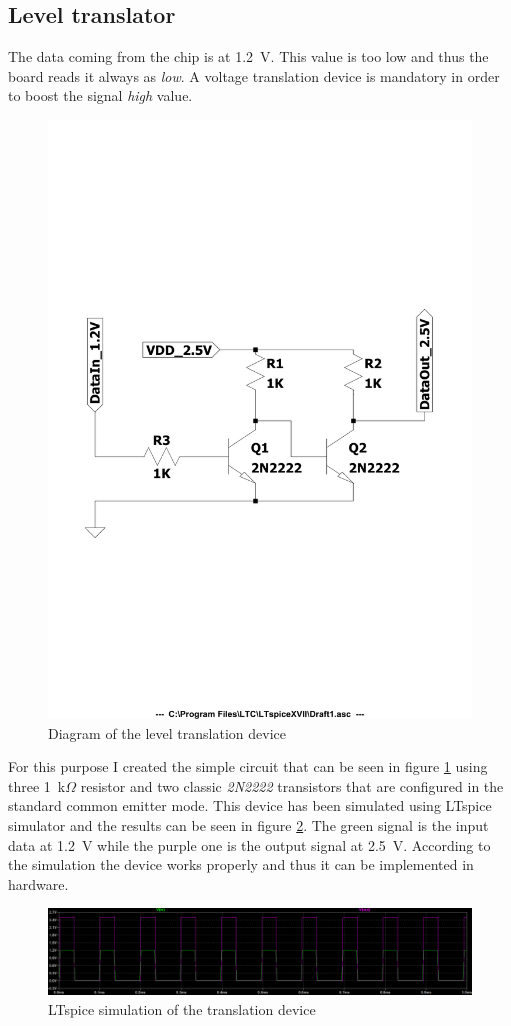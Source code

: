 \subsection{Level translator}\label{leveltranslator}
The data coming from the chip is at 1.2~V. This value is too low and thus the board reads it always as \textit{low}. A voltage translation device is mandatory in order to boost the signal \textit{high} value.
\begin{figure}[H]
	\centering
	\includegraphics[width=0.6\linewidth]{IMG/ch5/DIAGRAM}
	\caption{Diagram of the level translation device}
	\label{fig:diagram}
\end{figure}
\noindent For this purpose I created the simple circuit that can be seen in figure \ref{fig:diagram} using three 1~k$\Omega$ resistor and two classic \textit{2N2222} transistors that are configured in the standard common emitter mode.
This device has been simulated using LTspice simulator and the results can be seen in figure \ref{fig:transsimulation}.
The green signal is the input data at 1.2~V while the purple one is the output signal at 2.5~V.
According to the simulation the device works properly and thus it can be implemented in hardware.
\begin{figure}[H]
	\centering
	\includegraphics[width=1\linewidth]{IMG/ch5/TRANSSIMULATION}
	\caption{LTspice simulation of the translation device}
	\label{fig:transsimulation}
\end{figure}
